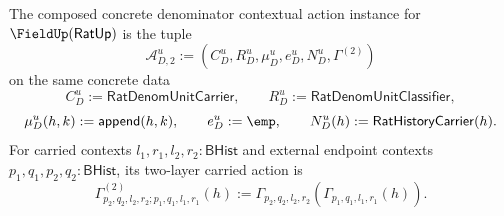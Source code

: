 \begin{definition}
\label{def:ratup-fieldup-composed-denominator-contextual-action-instance}
The composed concrete denominator contextual action instance for
$\FieldUp(\mathsf{RatUp})$ is the tuple
$$
\mathcal{A}_{D,2}^u:=(C_D^u,R_D^u,\mu_D^u,e_D^u,N_D^u,\Gamma^{(2)})
$$
on the same concrete data
$$
C_D^u:=\mathsf{RatDenomUnitCarrier},\qquad
R_D^u:=\mathsf{RatDenomUnitClassifier},
$$
$$
\mu_D^u(h,k):=\mathsf{append}(h,k),\qquad
e_D^u:=\emp,\qquad
N_D^u(h):=\mathsf{RatHistoryCarrier}(h).
$$
For carried contexts $l_1,r_1,l_2,r_2:\mathsf{BHist}$ and external endpoint
contexts $p_1,q_1,p_2,q_2:\mathsf{BHist}$, its two-layer carried action is
$$
\Gamma^{(2)}_{p_2,q_2,l_2,r_2;p_1,q_1,l_1,r_1}(h)
:=\Gamma_{p_2,q_2,l_2,r_2}(\Gamma_{p_1,q_1,l_1,r_1}(h)).
$$
\end{definition}


